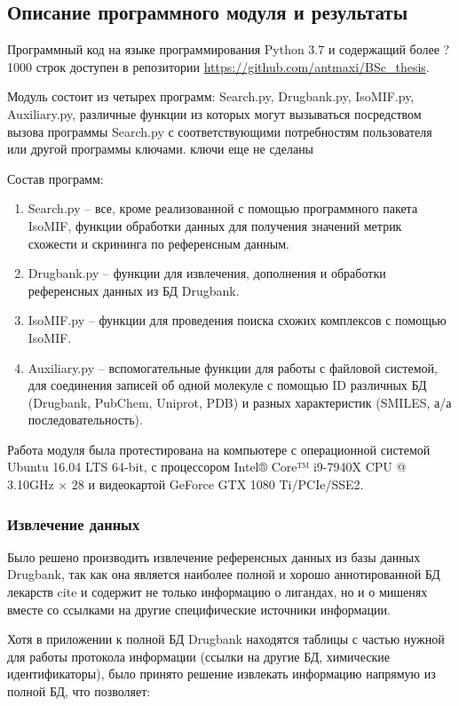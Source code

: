 \documentclass[a4paper,14pt]{article}         %
\begin{document}
\subsection{Описание программного модуля и результаты}
Программный код на языке программирования Python 3.7 \cite{python37} и содержащий более ?1000 строк доступен в репозитории \href{https://github.com/antmaxi/BSc\_thesis}{https://github.com/antmaxi/BSc\_thesis}.

Модуль состоит из четырех программ: Search.py, Drugbank.py, IsoMIF.py, Auxiliary.py, различные функции из которых могут вызываться посредством вызова программы Search.py с соответствующими потребностям пользователя или другой программы ключами. \color{orange} ключи еще не сделаны \color{black}

Состав программ:
\begin{enumerate}
	\item Search.py -- все, кроме реализованной с помощью программного пакета IsoMIF, функции обработки данных для получения значений метрик схожести и скрининга по референсным данным.
	\item Drugbank.py -- функции для извлечения, дополнения и обработки референсных данных из БД Drugbank.
	\item IsoMIF.py -- функции для проведения поиска схожих комплексов с помощью IsoMIF.
	\item Auxiliary.py -- вспомогательные функции для работы с файловой системой, для соединения записей об одной молекуле с помощью ID различных БД (Drugbank, PubChem, Uniprot, PDB) и разных характеристик (SMILES, а/а последовательность).
\end{enumerate}

Работа модуля была протестирована на компьютере с операционной системой Ubuntu 16.04 LTS 64-bit, с процессором Intel® Core™ i9-7940X CPU @ 3.10GHz $\times$ 28 и видеокартой GeForce GTX 1080 Ti/PCIe/SSE2.
\subsubsection{Извлечение данных}
Было решено производить извлечение референсных данных из базы данных Drugbank, так как она является наиболее полной и хорошо аннотированной БД лекарств cite{} и содержит не только информацию о лигандах, но и о мишенях вместе со ссылками на другие специфические источники информации. 

Хотя в приложении к полной БД Drugbank находятся таблицы с частью нужной для работы протокола информации (ссылки на другие БД, химические идентификаторы), было принято решение извлекать информацию напрямую из полной БД, что позволяет: 
\end{document}

